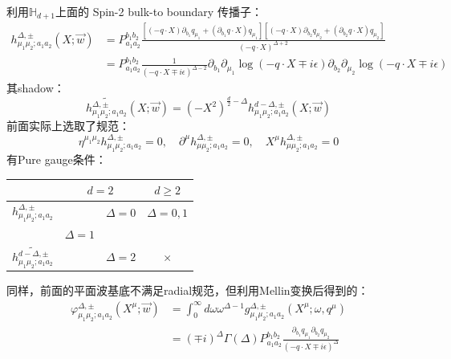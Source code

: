 利用$\mathbb{H}_{d+1}$上面的 Spin\mbox{-}2 bulk-to boundary 传播子：
\begin{equation}\label{eq:27.55}
	\boxed{
		\begin{aligned}
			h_{\mu_1\mu_2;a_1a_2}^{\Delta,\pm}(X;\vec{w})&=P_{a_1a_2}^{b_1b_2}\frac{\left[(-q\cdot X)\partial_{b_1}q_{\mu_1}+(\partial_{b_1}q\cdot X)q_{\mu_1}\right]\left[(-q\cdot X)\partial_{b_2}q_{\mu_2}+(\partial_{b_2}q\cdot X)q_{\mu_2}\right]}{(-q\cdot X)^{\Delta+2}}\\
			&=P_{a_{1}a_{2}}^{b_{1}b_{2}}\frac{1}{(-q\cdot X\mp i\epsilon)^{\Delta-2}}\partial_{b_{1}}\partial_{\mu_{1}}\log(-q\cdot X\mp i\epsilon)\partial_{b_{2}}\partial_{\mu_{2}}\log(-q\cdot X\mp i\epsilon)
		\end{aligned}
		}
\end{equation}
其shadow：
\begin{equation}
	\widetilde {h_{\mu_1\mu_2;a_1a_2}^{\Delta,\pm}}(X;\vec{w})=(-X^2)^{\frac{d}{2}-\Delta}h_{\mu_1\mu_2;a_1a_2}^{d-\Delta,\pm}(X;\vec{w})
\end{equation}
前面实际上选取了规范：
\begin{equation}
	\eta^{\mu_1\mu_2}h_{\mu_1\mu_2;a_1a_2}^{\Delta,\pm}=0,\quad\partial^{\mu}h_{\mu\mu_2;a_1a_2}^{\Delta,\pm}=0,\quad X^{\mu}h_{\mu\mu_2;a_1a_2}^{\Delta,\pm}=0
\end{equation}
有Pure gauge条件：
\begin{center}
	\begin{tabular}[H]{|c|cc|c|}
		\hline & \multicolumn{2}{c|}{$d=2$} & $d \geq 2$ \\
		\hline$h_{\mu_1\mu_2;a_1a_2}^{\Delta,\pm}$ & &$\Delta=0$& $\Delta=0,1$ \\
		& $\Delta=1$ & & \\
		$\widetilde{h_{\mu_1\mu_2;a_1a_2}^{d-\Delta,\pm}}$& &$\Delta=2$ & $\times$ \\
		\hline
	\end{tabular}
\end{center}
同样，前面的平面波基底不满足radial规范，但利用Mellin变换后得到的：
\begin{equation}
	\boxed{
	\begin{aligned}
		\varphi_{\mu_1\mu_2;a_1a_2}^{\Delta,\pm}(X^\mu;\vec{w})&=\int_0^\infty d\omega\omega^{\Delta-1}g_{\mu_1\mu_2;a_1a_2}^{\Delta,\pm}(X^\mu;\omega,q^\mu)\\&=(\mp i)^\Delta\Gamma(\Delta)P_{a_1a_2}^{b_1b_2}\frac{\partial_{b_1}q_{\mu_1}\partial_{b_2}q_{\mu_2}}{(-q\cdot X\mp i\epsilon)^\Delta}
	\end{aligned}
}
\end{equation}
